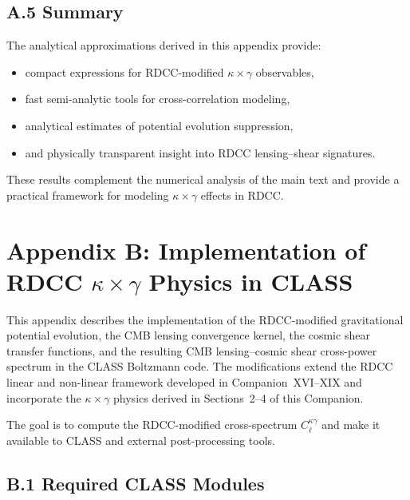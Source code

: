 \documentclass[11pt,a4paper]{article}
\begin{document}
\subsection*{A.5 Summary}

The analytical approximations derived in this appendix provide:

\begin{itemize}
    \item compact expressions for RDCC-modified $\kappa \times \gamma$ observables,
    \item fast semi-analytic tools for cross-correlation modeling,
    \item analytical estimates of potential evolution suppression,
    \item and physically transparent insight into RDCC lensing--shear signatures.
\end{itemize}

These results complement the numerical analysis of the main text and provide a practical 
framework for modeling $\kappa \times \gamma$ effects in RDCC.

\section*{Appendix B: Implementation of RDCC $\kappa \times \gamma$ Physics in CLASS}

This appendix describes the implementation of the RDCC-modified gravitational potential 
evolution, the CMB lensing convergence kernel, the cosmic shear transfer functions, and the 
resulting CMB lensing--cosmic shear cross-power spectrum in the CLASS Boltzmann code. The 
modifications extend the RDCC linear and non-linear framework developed in 
Companion~XVI--XIX and incorporate the $\kappa \times \gamma$ physics derived in 
Sections~2--4 of this Companion.

The goal is to compute the RDCC-modified cross-spectrum $C_{\ell}^{\kappa\gamma}$ and make 
it available to CLASS and external post-processing tools.

\subsection*{B.1 Required CLASS Modules}
\end{document}
